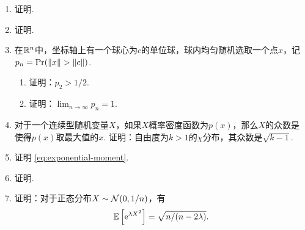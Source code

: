 \begin{enumerate}[wide,labelindent=0pt]
    \item \label{exercise:volume-surface-area} 证明. 
    \item \label{exercise:stein-paradox} 证明. 
    \item \label{exercise:circle-sample} 在$\mathbb{R}^n$中，坐标轴上有一个球心为$c$的单位球，球内均匀随机选取一个点$x$，记$p_n=\Pr(\norm{x}>\norm{c})$. 
    \begin{enumerate}
        \item 证明：$p_2>1/2$.
        \item 证明：$\lim_{n\to\infty}p_n=1$.
    \end{enumerate}
    \item \label{exercise:chi-mode} 对于一个连续型随机变量$X$，如果$X$概率密度函数为$p(x)$，那么$X$的众数是使得$p(x)$取最大值的$x$. 证明：自由度为$k>1$的$\chi$分布，其众数是$\sqrt{k-1}$. 
    \item \label{exercise:expoential-moment} 证明 \eqref{eq:exponential-moment}. 
    \item \label{exercise:hoeffding-inequality-general} 证明. 
    \item \label{exercise:moment-of-gaussian} 证明：对于正态分布$X\sim\mathcal{N}(0,1/n)$，有
    \[\mathbb{E}\left[\mathrm{e}^{\lambda X^2}\right]=\sqrt{n/(n-2\lambda)}.\] 
\end{enumerate}